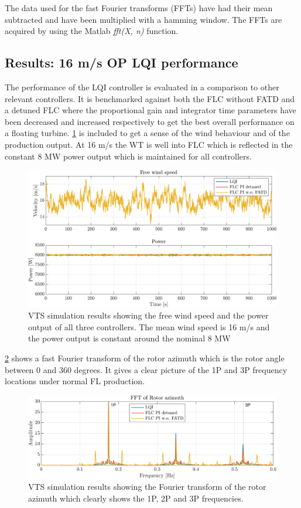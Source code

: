 The data used for the fast Fourier transforms (FFTs) have had their mean subtracted and have been multiplied with a hamming window. The FFTs are acquired by using the Matlab \textit{fft(X, n)} function.

\subsection{Results: 16 m/s OP LQI performance} \label{sec:test_vts_part1}
The performance of the LQI controller is evaluated in a comparison to other relevant controllers. It is benchmarked against both the FLC without FATD and a detuned FLC where the proportional gain and integrator time parameters have been decreased and increased respectively to get the best overall performance on a floating turbine. \cref{fig:vts_1_wind_pow} is included to get a sense of the wind behaviour and of the production output. At 16 m/s the WT is well into FLC which is reflected in the constant 8 MW power output which is maintained for all controllers.
\begin{figure}[ht]
	\centering
	\includegraphics[width=0.7\linewidth]{Graphics/TestResults/VTSplotting/1_wind_pow.png}
	\caption{VTS simulation results showing the free wind speed and the power output of all three controllers. The mean wind speed is 16 m/s and the power output is constant around the nominal 8 MW}
	\label{fig:vts_1_wind_pow}
\end{figure}
\cref{fig:vts_2_fftazi} shows a fast Fourier transform of the rotor azimuth which is the rotor angle between 0 and 360 degrees. It gives a clear picture of the 1P and 3P frequency locations under normal FL production.
\begin{figure}[ht]
	\centering
	\includegraphics[width=0.7\linewidth]{Graphics/TestResults/VTSplotting/2_fftazi.png}
	\caption{VTS simulation results showing the Fourier transform of the rotor azimuth which clearly shows the 1P, 2P and 3P frequencies.}
	\label{fig:vts_2_fftazi}
\end{figure}
